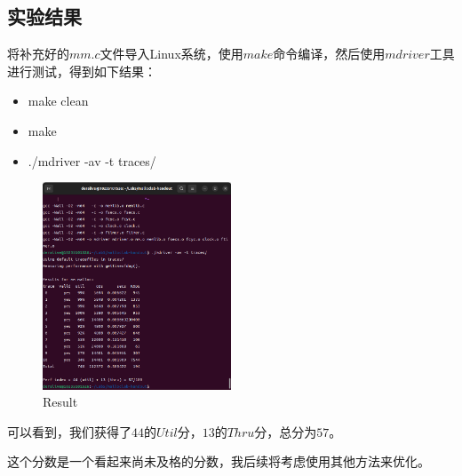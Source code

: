 \subsection{实验结果}
将补充好的$mm.c$文件导入Linux系统，使用$make$命令编译，然后使用$mdriver$工具进行测试，得到如下结果：
\begin{itemize}
    \item make clean
    \item make
    \item ./mdriver -av -t traces/
\end{itemize}

\begin{figure} [H]
    \centering
    \includegraphics[width=0.5\textwidth]{Result.png}
    \caption{Result}
\end{figure}

可以看到，我们获得了$44$的$Util$分，$13$的$Thru$分，总分为$57$。

这个分数是一个看起来尚未及格的分数，我后续将考虑使用其他方法来优化。
